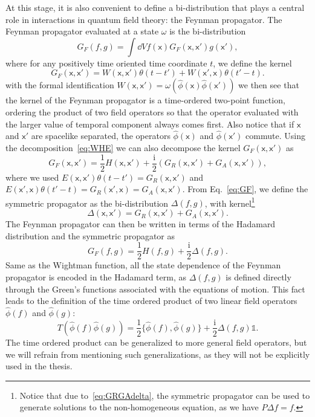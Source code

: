 \documentclass[letterpaper,12pt,titlepage,oneside,final]{book}
\newcommand{\openone}{\mathds{1}}
\newcommand{\mf}{\mathsf}%
\newcommand{\ii}{\mathrm{i}}
\begin{document}
At this stage, it is also convenient to define a bi-distribution that plays a central role in interactions in quantum field theory: the Feynman propagator. The Feynman propagator evaluated at a state $\omega$ is the bi-distribution
\begin{equation}
    G_F(f,g) = \int \dd V f(\mf x) G_F(\mf x, \mf x') g(\mf x'),
\end{equation}
where for any positively time oriented time coordinate $t$, we define the kernel
\begin{equation}\label{eq:GFWxxp}
    G_F(\mf x, \mf x') = W(\mf x, \mf x') \theta(t-t') + W(\mf x', \mf x) \theta(t'-t).
\end{equation}
with the formal identification $W(\mf x, \mf x') = \omega(\hat{\phi}(\mf x)\hat{\phi}(\mf x'))$ we then see that the kernel of the Feynman propagator is a time-ordered two-point function, ordering the product of two field operators so that the operator evaluated with the larger value of temporal component always comes first. Also notice that if $\mf x$ and $\mf x'$ are spacelike separated, the operators $\hat{\phi}(\mf x)$ and $\hat{\phi}(\mf x')$ commute. Using the decomposition~\eqref{eq:WHE} we can also decompose the kernel $G_F(\mf x,\mf x')$ as
\begin{equation}\label{eq:GF}
    G_F(\mf x, \mf x') = \frac{1}{2}H(\mf x,\mf x') + \frac{\ii}{2} (G_R(\mf x, \mf x') + G_A(\mf x, \mf x')),
\end{equation}
where we used $E(\mf x, \mf x')\theta(t-t') = G_R(\mf x, \mf x')$ and $E(\mf x', \mf x)\theta(t'-t) = G_R(\mf x', \mf x) = G_A(\mf x, \mf x')$. From Eq.~\eqref{eq:GF}, we define the symmetric propagator as the bi-distribution $\Delta(f,g)$, with kernel\footnote{Notice that due to~\eqref{eq:GRGAdelta}, the symmetric propagator can be used to generate solutions to the non-homogeneous equation, as we have $P\Delta f = f$.}
\begin{equation}
    \Delta(\mf x, \mf x') = G_R(\mf x, \mf x') + G_A(\mf x, \mf x').
\end{equation}
The Feynman propagator can then be written in terms of the Hadamard distribution and the symmetric propagator as
\begin{equation}\label{eq:GFHDelta}
    G_F(f,g) = \frac{1}{2}H(f,g) + \frac{\ii}{2}\Delta(f,g).
\end{equation}
Same as the Wightman function, all the state dependence of the Feynman propagator is encoded in the Hadamard term, as $\Delta(f,g)$ is defined directly through the Green's functions associated with the equations of motion. This fact leads to the definition of the time ordered product of two linear field operators $\hat{\phi}(f)$ and $\hat{\phi}(g)$:
\begin{equation}
    T(\hat{\phi}(f)\hat{\phi}(g)) = \frac{1}{2}\{\hat{\phi}(f),\hat{\phi}(g)\} + \frac{\ii}{2}\Delta(f,g)\openone.
\end{equation}
The time ordered product can be generalized to more general field operators, but we will refrain from mentioning such generalizations, as they will not be explicitly used in the thesis.
\end{document}
